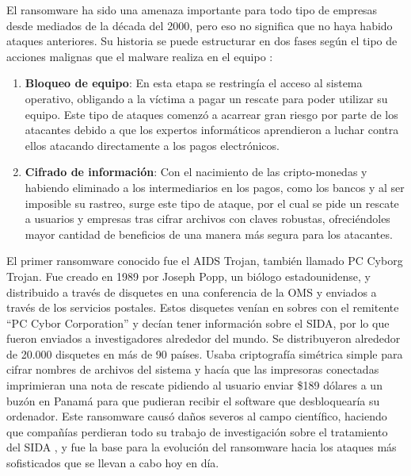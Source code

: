 \noindent El ransomware ha sido una amenaza importante para todo tipo de empresas desde mediados de la década del 2000, pero eso no significa que no haya habido ataques anteriores. Su historia se puede estructurar en dos fases según el tipo de acciones malignas que el malware realiza en el equipo \cite{histRansom}:
\begin{enumerate}
    \item \textbf{Bloqueo de equipo}: En esta etapa se restringía el acceso al sistema operativo, obligando a la víctima a pagar un rescate para poder utilizar su equipo. Este tipo de ataques comenzó a acarrear gran riesgo por parte de los atacantes debido a que los expertos informáticos aprendieron a luchar contra ellos atacando directamente a los pagos electrónicos.
    \item \textbf{Cifrado de información}: Con el nacimiento de las cripto-monedas y habiendo eliminado a los intermediarios en los pagos, como los bancos y al ser imposible su rastreo, surge este tipo de ataque, por el cual se pide un rescate a usuarios y empresas tras cifrar archivos con claves robustas, ofreciéndoles mayor cantidad de beneficios de una manera más segura para los atacantes.
    
\end{enumerate}

El primer ransomware conocido fue el AIDS Trojan, también llamado PC Cyborg Trojan. Fue creado en 1989 por Joseph Popp, un biólogo estadounidense, y distribuido a través de disquetes en una conferencia de la OMS y enviados a través de los servicios postales. Estos disquetes venían en sobres con el remitente ``PC Cybor Corporation'' y decían tener información sobre el SIDA, por lo que fueron enviados a investigadores alrededor del mundo. Se distribuyeron alrededor de 20.000 disquetes en más de 90 países. Usaba criptografía simétrica simple para cifrar nombres de archivos del sistema y hacía que las impresoras conectadas imprimieran una nota de rescate pidiendo al usuario enviar \$189 dólares a un buzón en Panamá para que pudieran recibir el software que desbloquearía su ordenador. Este ransomware causó daños severos al campo científico, haciendo que compañías perdieran todo su trabajo de investigación sobre el tratamiento del SIDA \cite{51}, y fue la base para la evolución del ransomware hacia los ataques más sofisticados que se llevan a cabo hoy en día. %


